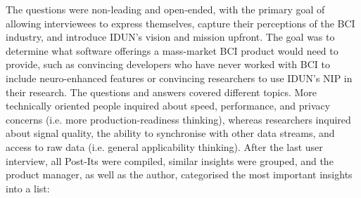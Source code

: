 The questions were non-leading and open-ended, with the primary goal of allowing interviewees to express themselves, capture their perceptions of the BCI industry, and introduce IDUN’s vision and mission upfront. The goal was to determine what software offerings a mass-market BCI product would need to provide, such as convincing developers who have never worked with BCI to include neuro-enhanced features or convincing researchers to use IDUN’s NIP in their research. The questions and answers covered different topics. More technically oriented people inquired about speed, performance, and privacy concerns (i.e. more production-readiness thinking), whereas researchers inquired about signal quality, the ability to synchronise with other data streams, and access to raw data (i.e. general applicability thinking). After the last user interview, all Post-Its were compiled, similar insights were grouped, and the product manager, as well as the author, categorised the most important insights into a list:

